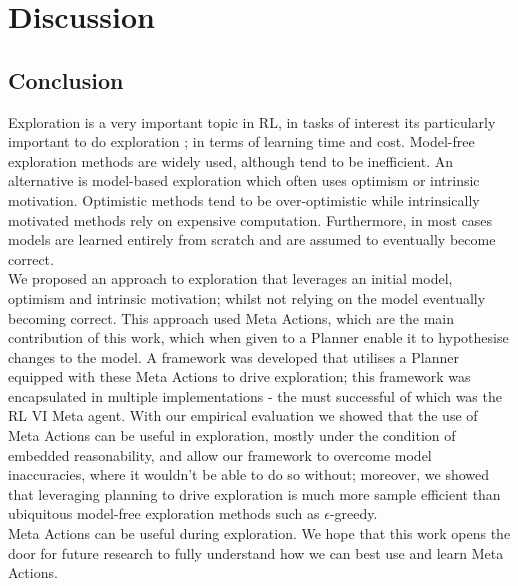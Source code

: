 \chapter{Discussion}
\label{chapter5}

\section{Conclusion}
Exploration is a very important topic in RL, in tasks of interest its particularly important to do exploration ; in terms of learning time and cost. Model-free exploration methods are widely used, although tend to be inefficient. An alternative is model-based exploration which often uses optimism or intrinsic motivation. Optimistic methods tend to be over-optimistic while intrinsically motivated methods rely on expensive computation. Furthermore, in most cases models are learned entirely from scratch and are assumed to eventually become correct. 
\\We proposed an approach to exploration that leverages an initial model, optimism and intrinsic motivation; whilst not relying on the model eventually becoming correct. This approach used Meta Actions, which are the main contribution of this work, which when given to a Planner enable it to hypothesise changes to the model. A framework was developed that utilises a Planner equipped with these Meta Actions to drive exploration; this framework was encapsulated in multiple implementations - the must successful of which was the RL VI Meta agent. With our empirical evaluation we showed that the use of Meta Actions can be useful in exploration, mostly under the condition of embedded reasonability, and allow our framework to overcome model inaccuracies, where it wouldn't be able to do so without; moreover, we showed that leveraging planning to drive exploration is much more sample efficient than ubiquitous model-free exploration methods such as $\epsilon$-greedy.
\\Meta Actions can be useful during exploration. We hope that this work opens the door for future research to fully understand how we can best use and learn Meta Actions.

